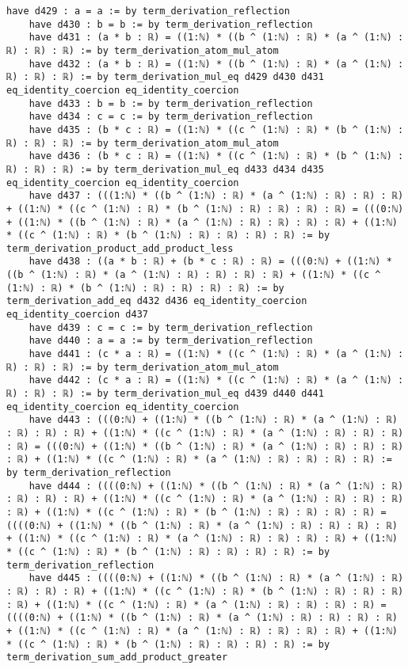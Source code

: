 \documentclass{article}
\begin{document}
\begin{tcolorbox}[colback=white!10, width=\linewidth]
\begin{lstlisting}[language=Lean4]
    have d429 : a = a := by term_derivation_reflection
    have d430 : b = b := by term_derivation_reflection
    have d431 : (a * b : ℝ) = ((1:ℕ) * ((b ^ (1:ℕ) : ℝ) * (a ^ (1:ℕ) : ℝ) : ℝ) : ℝ) := by term_derivation_atom_mul_atom
    have d432 : (a * b : ℝ) = ((1:ℕ) * ((b ^ (1:ℕ) : ℝ) * (a ^ (1:ℕ) : ℝ) : ℝ) : ℝ) := by term_derivation_mul_eq d429 d430 d431 eq_identity_coercion eq_identity_coercion
    have d433 : b = b := by term_derivation_reflection
    have d434 : c = c := by term_derivation_reflection
    have d435 : (b * c : ℝ) = ((1:ℕ) * ((c ^ (1:ℕ) : ℝ) * (b ^ (1:ℕ) : ℝ) : ℝ) : ℝ) := by term_derivation_atom_mul_atom
    have d436 : (b * c : ℝ) = ((1:ℕ) * ((c ^ (1:ℕ) : ℝ) * (b ^ (1:ℕ) : ℝ) : ℝ) : ℝ) := by term_derivation_mul_eq d433 d434 d435 eq_identity_coercion eq_identity_coercion
    have d437 : (((1:ℕ) * ((b ^ (1:ℕ) : ℝ) * (a ^ (1:ℕ) : ℝ) : ℝ) : ℝ) + ((1:ℕ) * ((c ^ (1:ℕ) : ℝ) * (b ^ (1:ℕ) : ℝ) : ℝ) : ℝ) : ℝ) = (((0:ℕ) + ((1:ℕ) * ((b ^ (1:ℕ) : ℝ) * (a ^ (1:ℕ) : ℝ) : ℝ) : ℝ) : ℝ) + ((1:ℕ) * ((c ^ (1:ℕ) : ℝ) * (b ^ (1:ℕ) : ℝ) : ℝ) : ℝ) : ℝ) := by term_derivation_product_add_product_less
    have d438 : ((a * b : ℝ) + (b * c : ℝ) : ℝ) = (((0:ℕ) + ((1:ℕ) * ((b ^ (1:ℕ) : ℝ) * (a ^ (1:ℕ) : ℝ) : ℝ) : ℝ) : ℝ) + ((1:ℕ) * ((c ^ (1:ℕ) : ℝ) * (b ^ (1:ℕ) : ℝ) : ℝ) : ℝ) : ℝ) := by term_derivation_add_eq d432 d436 eq_identity_coercion eq_identity_coercion d437
    have d439 : c = c := by term_derivation_reflection
    have d440 : a = a := by term_derivation_reflection
    have d441 : (c * a : ℝ) = ((1:ℕ) * ((c ^ (1:ℕ) : ℝ) * (a ^ (1:ℕ) : ℝ) : ℝ) : ℝ) := by term_derivation_atom_mul_atom
    have d442 : (c * a : ℝ) = ((1:ℕ) * ((c ^ (1:ℕ) : ℝ) * (a ^ (1:ℕ) : ℝ) : ℝ) : ℝ) := by term_derivation_mul_eq d439 d440 d441 eq_identity_coercion eq_identity_coercion
    have d443 : (((0:ℕ) + ((1:ℕ) * ((b ^ (1:ℕ) : ℝ) * (a ^ (1:ℕ) : ℝ) : ℝ) : ℝ) : ℝ) + ((1:ℕ) * ((c ^ (1:ℕ) : ℝ) * (a ^ (1:ℕ) : ℝ) : ℝ) : ℝ) : ℝ) = (((0:ℕ) + ((1:ℕ) * ((b ^ (1:ℕ) : ℝ) * (a ^ (1:ℕ) : ℝ) : ℝ) : ℝ) : ℝ) + ((1:ℕ) * ((c ^ (1:ℕ) : ℝ) * (a ^ (1:ℕ) : ℝ) : ℝ) : ℝ) : ℝ) := by term_derivation_reflection
    have d444 : ((((0:ℕ) + ((1:ℕ) * ((b ^ (1:ℕ) : ℝ) * (a ^ (1:ℕ) : ℝ) : ℝ) : ℝ) : ℝ) + ((1:ℕ) * ((c ^ (1:ℕ) : ℝ) * (a ^ (1:ℕ) : ℝ) : ℝ) : ℝ) : ℝ) + ((1:ℕ) * ((c ^ (1:ℕ) : ℝ) * (b ^ (1:ℕ) : ℝ) : ℝ) : ℝ) : ℝ) = ((((0:ℕ) + ((1:ℕ) * ((b ^ (1:ℕ) : ℝ) * (a ^ (1:ℕ) : ℝ) : ℝ) : ℝ) : ℝ) + ((1:ℕ) * ((c ^ (1:ℕ) : ℝ) * (a ^ (1:ℕ) : ℝ) : ℝ) : ℝ) : ℝ) + ((1:ℕ) * ((c ^ (1:ℕ) : ℝ) * (b ^ (1:ℕ) : ℝ) : ℝ) : ℝ) : ℝ) := by term_derivation_reflection
    have d445 : ((((0:ℕ) + ((1:ℕ) * ((b ^ (1:ℕ) : ℝ) * (a ^ (1:ℕ) : ℝ) : ℝ) : ℝ) : ℝ) + ((1:ℕ) * ((c ^ (1:ℕ) : ℝ) * (b ^ (1:ℕ) : ℝ) : ℝ) : ℝ) : ℝ) + ((1:ℕ) * ((c ^ (1:ℕ) : ℝ) * (a ^ (1:ℕ) : ℝ) : ℝ) : ℝ) : ℝ) = ((((0:ℕ) + ((1:ℕ) * ((b ^ (1:ℕ) : ℝ) * (a ^ (1:ℕ) : ℝ) : ℝ) : ℝ) : ℝ) + ((1:ℕ) * ((c ^ (1:ℕ) : ℝ) * (a ^ (1:ℕ) : ℝ) : ℝ) : ℝ) : ℝ) + ((1:ℕ) * ((c ^ (1:ℕ) : ℝ) * (b ^ (1:ℕ) : ℝ) : ℝ) : ℝ) : ℝ) := by term_derivation_sum_add_product_greater

\end{lstlisting}
\end{tcolorbox}
\end{document}
